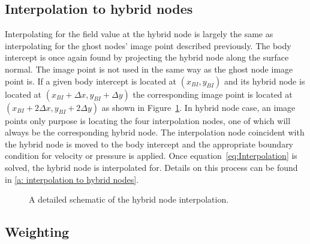 \subsection{Interpolation to hybrid nodes}
\label{Sec:Interpolation}

Interpolating for the field value at the hybrid node is largely the same as interpolating for the ghost nodes' image point described previously. 
The body intercept is once again found by projecting the hybrid node along the surface normal. 
The image point is not used in the same way as the ghost node image point is. 
If a given body intercept is located at $(x_{BI},y_{BI})$ and its hybrid node is located at $(x_{BI}+\Delta x,y_{BI}+\Delta y)$ the corresponding image point is located at $(x_{BI}+2\Delta x,y_{BI}+2\Delta y)$ as shown in Figure~\ref{fig:Interpolate}. 
In hybrid node case, an image points only purpose is locating the four interpolation nodes, one of which will always be the corresponding hybrid node. 
The interpolation node coincident with the hybrid node is moved to the body intercept and the appropriate boundary condition for velocity or pressure is applied.
Once equation~\eqref{eq:Interpolation} is solved, the hybrid node is interpolated for.
Details on this process can be found in \ref{a: interpolation to hybrid nodes}. 
\begin{figure}[!htb]
	\centering
	
	\caption{A detailed schematic of the hybrid node interpolation.}
	\label{fig:Interpolate}
\end{figure}

\subsection{Weighting}
\label{Sec:Weighting}

